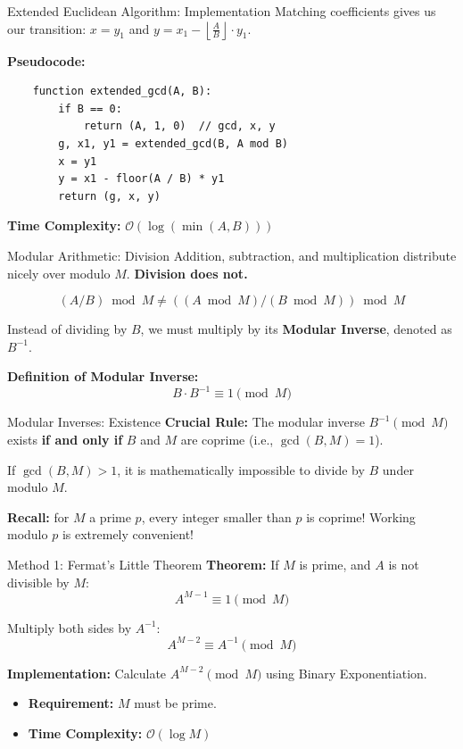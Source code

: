 \documentclass[aspectratio=169]{beamer}
\begin{document}
\begin{frame}[fragile]{Extended Euclidean Algorithm: Implementation}
    Matching coefficients gives us our transition: 
    $x = y_1$ and $y = x_1 - \left\lfloor \frac{A}{B} \right\rfloor \cdot y_1$.
    
    \vspace{0.3cm}
    \textbf{Pseudocode:}
    \begin{verbatim}
    function extended_gcd(A, B):
        if B == 0:
            return (A, 1, 0)  // gcd, x, y
        g, x1, y1 = extended_gcd(B, A mod B)
        x = y1
        y = x1 - floor(A / B) * y1
        return (g, x, y)
    \end{verbatim}
    \textbf{Time Complexity:} $\mathcal{O}(\log(\min(A, B)))$
\end{frame}

\begin{frame}{Modular Arithmetic: Division}
    Addition, subtraction, and multiplication distribute nicely over modulo $M$. \textbf{Division does not.}
    
    $$(A / B) \bmod M \neq ( (A \bmod M) / (B \bmod M) ) \bmod M$$
    
    \vspace{0.5cm}
    Instead of dividing by $B$, we must multiply by its \textbf{Modular Inverse}, denoted as $B^{-1}$.
    
    \textbf{Definition of Modular Inverse:}
    $$B \cdot B^{-1} \equiv 1 \pmod M$$
    
    
\end{frame}

\begin{frame}{Modular Inverses: Existence}
    \textbf{Crucial Rule:} 
    The modular inverse $B^{-1} \pmod M$ exists \textbf{if and only if} $B$ and $M$ are coprime (i.e., $\gcd(B, M) = 1$).
    
    \vspace{0.5cm}
    If $\gcd(B, M) > 1$, it is mathematically impossible to divide by $B$ under modulo $M$.

    \textbf{Recall:} for $M$ a prime $p$, every integer smaller than $p$ is coprime! Working modulo $p$ is extremely convenient!
\end{frame}

\begin{frame}{Method 1: Fermat's Little Theorem}
    \textbf{Theorem:} If $M$ is prime, and $A$ is not divisible by $M$:
    $$A^{M-1} \equiv 1 \pmod M$$
    
    Multiply both sides by $A^{-1}$:
    $$A^{M-2} \equiv A^{-1} \pmod M$$
    
    \vspace{0.5cm}
    \textbf{Implementation:}
    Calculate $A^{M-2} \pmod M$ using Binary Exponentiation.
    \begin{itemize}
        \item \textbf{Requirement:} $M$ must be prime.
        \item \textbf{Time Complexity:} $\mathcal{O}(\log M)$
    \end{itemize}
\end{frame}
\end{document}
